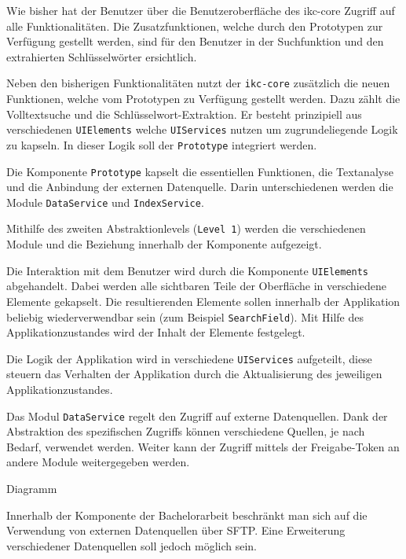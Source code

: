 Wie bisher hat der Benutzer über die Benutzeroberfläche des \gls{ikc-core} Zugriff auf alle Funktionalitäten. Die Zusatzfunktionen, welche durch den Prototypen zur Verfügung gestellt werden, sind für den Benutzer in der Suchfunktion und den extrahierten Schlüsselwörter ersichtlich.

Neben den bisherigen Funktionalitäten nutzt der \texttt{ikc-core} zusätzlich die neuen Funktionen, welche vom Prototypen zu Verfügung gestellt werden. Dazu zählt die Volltextsuche und die Schlüs\-sel\-wort-\-Ex\-trak\-tion. Er besteht prinzipiell aus verschiedenen \texttt{UI\-Ele\-ments} welche \texttt{UI\-Ser\-vices} nutzen um zugrundeliegende Logik zu kapseln. In dieser Logik soll der \texttt{Prototype} integriert werden.

Die Komponente \texttt{Prototype} kapselt die essentiellen Funktionen, die Textanalyse und die Anbindung der externen Datenquelle. Darin unterschiedenen werden die Module \texttt{DataService} und \texttt{IndexService}.

Mithilfe des zweiten Abstraktionlevels (\texttt{Level 1}) werden die verschiedenen Module und die Beziehung innerhalb der Komponente aufgezeigt. 

Die Interaktion mit dem Benutzer wird durch die Komponente \texttt{UI\-Ele\-ments} abgehandelt. Dabei werden alle sichtbaren Teile der Oberfläche in verschiedene Elemente gekapselt. Die resultierenden Elemente sollen innerhalb der Applikation beliebig wiederverwendbar sein (zum Beispiel \texttt{SearchField}). Mit Hilfe des Applikationzustandes wird der Inhalt der Elemente festgelegt.

Die Logik der Applikation wird in verschiedene \texttt{UIServices} aufgeteilt, diese steuern das Verhalten der Applikation durch die Aktualisierung des jeweiligen Applikationzustandes.

Das Modul \texttt{DataService} regelt den Zugriff auf externe Datenquellen. Dank der Abstraktion des spezifischen Zugriffs können verschiedene Quellen, je nach Bedarf, verwendet werden. Weiter kann der Zugriff mittels der Freigabe-Token an andere Module weitergegeben werden. %

Diagramm

Innerhalb der Komponente der Bachelorarbeit beschränkt man sich auf die Verwendung von externen Datenquellen über \gls{SFTP}. Eine Erweiterung verschiedener Datenquellen soll jedoch möglich sein.

